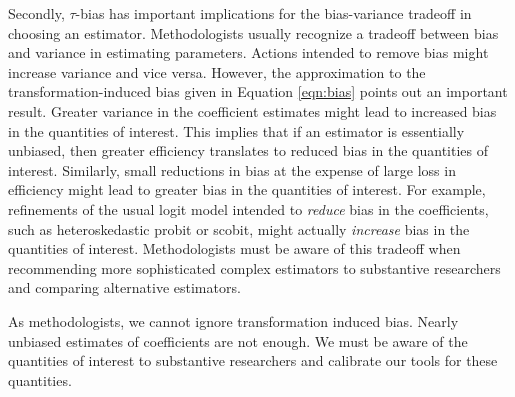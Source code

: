 \documentclass[12pt]{article}
\begin{document}
Secondly, $\tau$-bias has important implications for the bias-variance tradeoff in choosing an estimator. 
Methodologists usually recognize a tradeoff between bias and variance in estimating parameters. 
Actions intended to remove bias might increase variance and vice versa.
However, the approximation to the transformation-induced bias given in Equation \ref{eqn:bias} points out an important result. 
Greater variance in the coefficient estimates might lead to increased bias in the quantities of interest. 
This implies that if an estimator is essentially unbiased, then greater efficiency translates to reduced bias in the quantities of interest. 
Similarly, small reductions in bias at the expense of large loss in efficiency might lead to greater bias in the quantities of interest. 
For example, refinements of the usual logit model intended to \textit{reduce} bias in the coefficients, such as heteroskedastic probit or scobit, might actually \textit{increase} bias in the quantities of interest. 
Methodologists must be aware of this tradeoff when recommending more sophisticated complex estimators to substantive researchers and comparing alternative estimators.

As methodologists, we cannot ignore transformation induced bias. Nearly unbiased estimates of coefficients are not enough. We must be aware of the quantities of interest to substantive researchers and calibrate our tools for these quantities.



\singlespace 
\small


\end{document}
